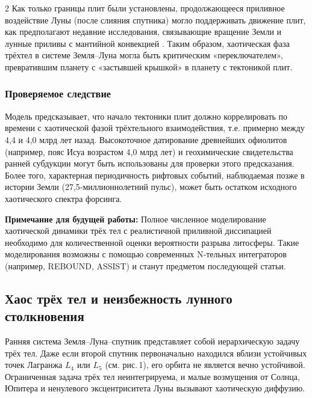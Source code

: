 \documentclass[11pt,a4paper]{article}
\begin{document}
\begin{multicols}{2}
		Как только границы плит были установлены, продолжающееся приливное воздействие Луны (после слияния спутника) могло поддерживать движение плит, как предполагают недавние исследования, связывающие вращение Земли и лунные приливы с мантийной конвекцией \cite{Rampino2021}. Таким образом, хаотическая фаза трёхтел в системе Земля–Луна могла быть критическим «переключателем», превратившим планету с «застывшей крышкой» в планету с тектоникой плит.
		
		\subsubsection{Проверяемое следствие}
		
		Модель предсказывает, что начало тектоники плит должно коррелировать по времени с хаотической фазой трёхтельного взаимодействия, т.е. примерно между 4,4 и 4,0 млрд лет назад. Высокоточное датирование древнейших офиолитов (например, пояс Исуа возрастом 4,0 млрд лет) и геохимические свидетельства ранней субдукции могут быть использованы для проверки этого предсказания. Более того, характерная периодичность рифтовых событий, наблюдаемая позже в истории Земли (27,5‑миллионнолетний пульс), может быть остатком исходного хаотического спектра форсинга.
		
		\vspace{0.2cm}
		\noindent
		\textbf{Примечание для будущей работы:} Полное численное моделирование хаотической динамики трёх тел с реалистичной приливной диссипацией необходимо для количественной оценки вероятности разрыва литосферы. Такие моделирования возможны с помощью современных N‑тельных интеграторов (например, REBOUND, ASSIST) и станут предметом последующей статьи.
		
		
		\subsection{Хаос трёх тел и неизбежность лунного столкновения}
		
		Ранняя система Земля–Луна–спутник представляет собой иерархическую задачу трёх тел.
		Даже если второй спутник первоначально находился вблизи устойчивых точек Лагранжа
		\(L_4\) или \(L_5\) (см. рис. 1), его орбита не является вечно устойчивой.
		Ограниченная задача трёх тел неинтегрируема, и малые возмущения
		от Солнца, Юпитера и ненулевого эксцентриситета Луны вызывают хаотическую диффузию.
		

\end{multicols}
\end{document}
